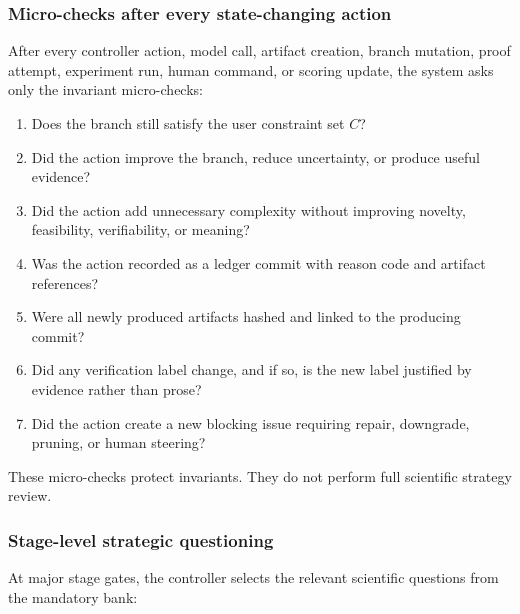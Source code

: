 \documentclass[11pt]{article}
\begin{document}
\subsubsection*{Micro-checks after every state-changing action}
After every controller action, model call, artifact creation, branch mutation, proof attempt, experiment run, human command, or scoring update, the system asks only the invariant micro-checks:
\begin{enumerate}[leftmargin=*]
    \item Does the branch still satisfy the user constraint set $C$?
    \item Did the action improve the branch, reduce uncertainty, or produce useful evidence?
    \item Did the action add unnecessary complexity without improving novelty, feasibility, verifiability, or meaning?
    \item Was the action recorded as a ledger commit with reason code and artifact references?
    \item Were all newly produced artifacts hashed and linked to the producing commit?
    \item Did any verification label change, and if so, is the new label justified by evidence rather than prose?
    \item Did the action create a new blocking issue requiring repair, downgrade, pruning, or human steering?
\end{enumerate}
These micro-checks protect invariants. They do not perform full scientific strategy review.

\subsubsection*{Stage-level strategic questioning}
At major stage gates, the controller selects the relevant scientific questions from the mandatory bank:
\end{document}

